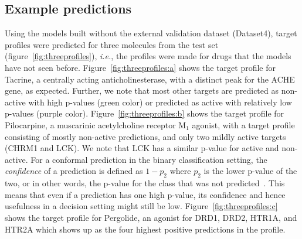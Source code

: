 \documentclass[utf8]{frontiersSCNS} %
\begin{document}
\subsection{Example predictions}
Using the models built without the external validation dataset (Dataset4), target
profiles were predicted for three molecules from the test set
(figure~\ref{fig:threeprofiles}), \textit{i.e.}, the profiles were made for
drugs that the models have not seen before. Figure~\ref{fig:threeprofiles:a}
shows the target profile for Tacrine, a centrally acting anticholinesterase,
with a distinct peak for the ACHE gene, as expected. Further, we note that most
other targets are predicted as non-active with high p-values (green color) or
predicted as active with relatively low p-values (purple color).
Figure~\ref{fig:threeprofiles:b} shows the target profile for Pilocarpine, a
muscarinic acetylcholine receptor M$_1$ agonist, with a target profile
consisting of mostly non-active predictions, and only two mildly active targets
(CHRM1 and LCK). We note that LCK has a similar p-value for active and
non-active. For a conformal prediction in the binary classification setting, the 
\textit{confidence} of a prediction is defined as $1 - p_2$ where $p_2$ is the
lower p-value of the two, or in other words, the p-value for the class that was
not predicted~\cite{Saunders1999}.  This means that even if a prediction has
one high p-value, its confidence and hence usefulness in a decision setting
might still be low. Figure~\ref{fig:threeprofiles:c} shows the target profile for
Pergolide, an agonist for DRD1, DRD2, HTR1A, and HTR2A which shows up as the
four highest positive predictions in the profile.
\end{document}
